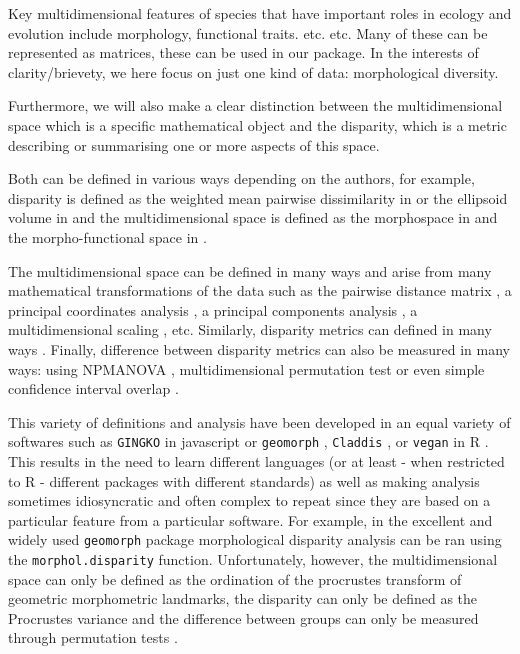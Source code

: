 \documentclass[12pt,letterpaper]{article}
\begin{document}
Key multidimensional features of species that have important roles in ecology and evolution include morphology, functional traits. etc. etc.
Many of these can be represented as matrices, these can be used in our package.
In the interests of clarity/brievety, we here focus on just one kind of data: morphological diversity.


Furthermore, we will also make a clear distinction between the multidimensional space which is a specific mathematical object and the disparity, which is a metric describing or summarising one or more aspects of this space.


Both can be defined in various ways depending on the authors, for example, disparity is defined as the weighted mean pairwise dissimilarity in \cite{Close2015} or the ellipsoid volume in \cite{DonohueDim} and the multidimensional space is defined as the morphospace in \cite{raup1966geometric} and the morpho-functional space in \cite{diaz2016global}.




The multidimensional space can be defined in many ways and arise from many mathematical transformations of the data such as the pairwise distance matrix \citep{Close2015}, a principal coordinates analysis \citep[PCO;][]{Brusatte12092008}, a principal components analysis \citep[PCA;][]{zelditch2012geometric}, a multidimensional scaling \citep[MDS;][]{DonohueDim}, etc.
Similarly, disparity metrics \citep[or indices;][]{Hopkins2017} can defined in many ways \citep[e.g.][or combinations thereof]{Wills2001,Ciampaglio2001,foth2012different,DonohueDim,Hughes20082013,finlay2015morphological,Close2015,diaz2016global}.
Finally, difference between disparity metrics can also be measured in many ways: using NPMANOVA \citep[e.g.][]{Brusatte12092008}, multidimensional permutation test \citep[e.g.][]{diaz2016global} or even simple confidence interval overlap \citep[e.g.][]{halliday2016eutherian}.

This variety of definitions and analysis have been developed in an equal variety of softwares such as \texttt{GINGKO} in javascript \citep{bouxin2005ginkgo,de2007ginkgo} or \texttt{geomorph} \citep{adams2013geomorph,adams2017geometric}, \texttt{Claddis} \citep{Claddis}, or \texttt{vegan} \citep{oksanen2007vegan} in R \citep{R}.
This results in the need to learn different languages (or at least - when restricted to R - different packages with different standards) as well as making analysis sometimes idiosyncratic and often complex to repeat since they are based on a particular feature from a particular software.
For example, in the excellent and widely used \texttt{geomorph} package morphological disparity analysis can be ran using the \texttt{morphol.disparity} function.
Unfortunately, however, the multidimensional space can only be defined as the ordination of the procrustes transform of geometric morphometric landmarks, the disparity can only be defined as the Procrustes variance and the difference between groups can only be measured through permutation tests \citep{zelditch2012geometric,adams2013geomorph,adams2017geometric}.
\end{document}
